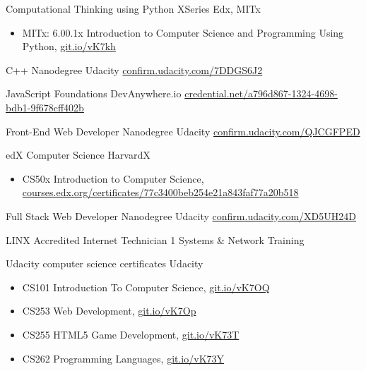 \documentclass[10pt,a4paper,sans]{moderncv} %
\begin{document}
    {Computational Thinking using Python XSeries}
    {Edx, MITx}{}
    {}
    {        \begin{itemize}
            \item{ MITx: 6.00.1x Introduction to Computer Science and Programming Using Python, \href{ https://git.io/vK7kh }{ git.io/vK7kh } }
        \end{itemize}
}

    {C++ Nanodegree}
    {Udacity}{}
    { \href{ https://confirm.udacity.com/7DDGS6J2 }{ confirm.udacity.com/7DDGS6J2 } }
    {}

    {JavaScript Foundations}
    {DevAnywhere.io}{}
    { \href{ https://www.credential.net/a796d867-1324-4698-bdb1-9f678cff402b }{ credential.net/a796d867-1324-4698-bdb1-9f678cff402b } }
    {}

    {Front-End Web Developer Nanodegree}
    {Udacity}{}
    { \href{ https://confirm.udacity.com/QJCGFPED }{ confirm.udacity.com/QJCGFPED } }
    {}

    {edX Computer Science}
    {HarvardX}{}
    {}
    {        \begin{itemize}
            \item{ CS50x Introduction to Computer Science, \href{ https://courses.edx.org/certificates/77c3400beb254e21a843faf77a20b518 }{ courses.edx.org/certificates/77c3400beb254e21a843faf77a20b518 } }
        \end{itemize}
}

    {Full Stack Web Developer Nanodegree}
    {Udacity}{}
    { \href{ https://confirm.udacity.com/XD5UH24D }{ confirm.udacity.com/XD5UH24D } }
    {}

    {LINX Accredited Internet Technician 1}
    {Systems \& Network Training}{}
    {}
    {}

    {Udacity computer science certificates}
    {Udacity}{}
    {}
    {        \begin{itemize}
            \item{ CS101 Introduction To Computer Science, \href{ https://git.io/vK7OQ }{ git.io/vK7OQ } }
            \item{ CS253 Web Development, \href{ https://git.io/vK7Op }{ git.io/vK7Op } }
            \item{ CS255 HTML5 Game Development, \href{ https://git.io/vK73T }{ git.io/vK73T } }
            \item{ CS262 Programming Languages, \href{ https://git.io/vK73Y }{ git.io/vK73Y } }
        \end{itemize}
}
\end{document}
